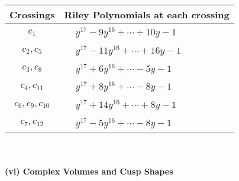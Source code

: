 \documentclass[1p]{elsarticle_modified}
\theoremstyle{definition}
\begin{document}
\begin{tabular}{m{50pt}|m{274pt}}
Crossings & \hspace{64pt}Riley Polynomials at each crossing \\
\hline $$\begin{aligned}c_{1}\end{aligned}$$&$\begin{aligned}
&y^{17}-9 y^{16}+\cdots+10 y-1
\end{aligned}$\\
\hline $$\begin{aligned}c_{2},c_{5}\end{aligned}$$&$\begin{aligned}
&y^{17}-11 y^{16}+\cdots+16 y-1
\end{aligned}$\\
\hline $$\begin{aligned}c_{3},c_{8}\end{aligned}$$&$\begin{aligned}
&y^{17}+6 y^{16}+\cdots-5 y-1
\end{aligned}$\\
\hline $$\begin{aligned}c_{4},c_{11}\end{aligned}$$&$\begin{aligned}
&y^{17}+8 y^{16}+\cdots-8 y-1
\end{aligned}$\\
\hline $$\begin{aligned}c_{6},c_{9},c_{10}\end{aligned}$$&$\begin{aligned}
&y^{17}+14 y^{16}+\cdots+8 y-1
\end{aligned}$\\
\hline $$\begin{aligned}c_{7},c_{12}\end{aligned}$$&$\begin{aligned}
&y^{17}-5 y^{16}+\cdots-8 y-1
\end{aligned}$\\
\hline
\end{tabular}\\~\\
\newpage\flushleft \textbf{(vi) Complex Volumes and Cusp Shapes}
\end{document}
